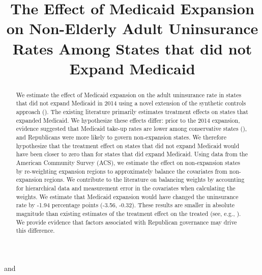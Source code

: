 \documentclass[aoas]{imsart}
\theoremstyle{plain}
\theoremstyle{remark}
\begin{document}
\begin{frontmatter}
\title{The Effect of Medicaid Expansion on Non-Elderly Adult Uninsurance Rates Among States that did not Expand Medicaid}
\runtitle{}

\begin{aug}
\author[A]{ } and
\author[A]{ }
\address[A]{Carnegie Mellon University, }

\end{aug}

\begin{abstract}
We estimate the effect of Medicaid expansion on the adult uninsurance rate in states that did not expand Medicaid in 2014 using a novel extension of the synthetic controls approach (\cite{abadie2010synthetic}). The existing literature primarily estimates treatment effects on states that expanded Medicaid. We hypothesize these effects differ: prior to the 2014 expansion, evidence suggested that Medicaid take-up rates are lower among conservative states (\cite{sommers2012understanding}), and Republicans were more likely to govern non-expansion states. We therefore hypothesize that the treatment effect on states that did not expand Medicaid would have been closer to zero than for states that did expand Medicaid. Using data from the American Community Survey (ACS), we estimate the effect on non-expansion states by re-weighting expansion regions to approximately balance the covariates from non-expansion regions. We contribute to the literature on balancing weights by accounting for hierarchical data and measurement error in the covariates when calculating the weights. We estimate that Medicaid expansion would have changed the uninsurance rate by -1.94 percentage points (-3.56, -0.32). These results are smaller in absolute magnitude than existing estimates of the treatment effect on the treated (see, e.g., \cite{courtemanche2017early}). We provide evidence that factors associated with Republican governance may drive this difference.
\end{abstract}


\end{frontmatter}
\end{document}
